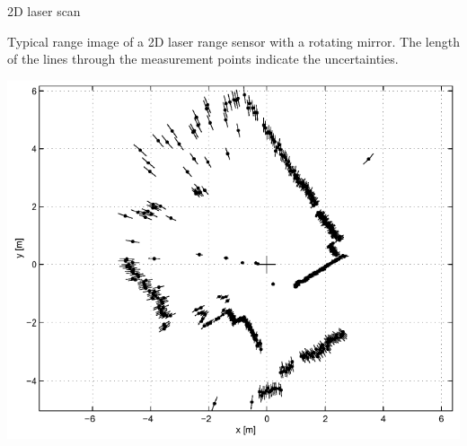\documentclass[compress]{beamer}
\begin{document}
\begin{frame}{2D laser scan}

    Typical range image of a 2D laser range sensor with a rotating mirror.
    The length of the lines through the measurement points indicate the
    uncertainties.

    \begin{center}
        \includegraphics[width=0.7\linewidth]{laserscan}
    \end{center}
\end{frame}
\end{document}
